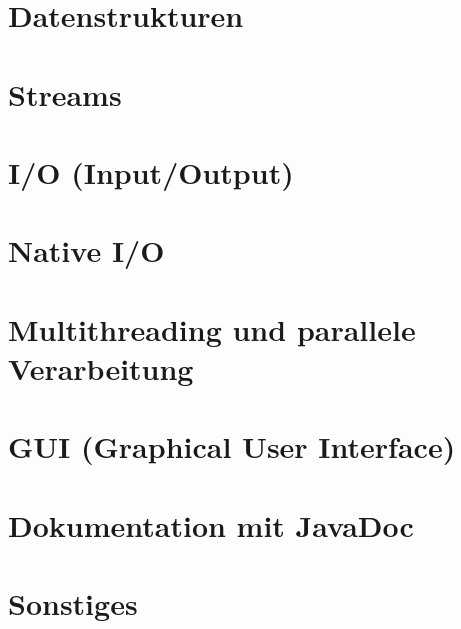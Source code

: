 \section{Datenstrukturen}
	

\section{Streams}
	

\section{I/O (Input/Output)}
	

\section{Native I/O}
	

\section{Multithreading und parallele Verarbeitung}
	

\section{GUI (Graphical User Interface)}
	

\section{Dokumentation mit JavaDoc}
	

\section{Sonstiges}
	
